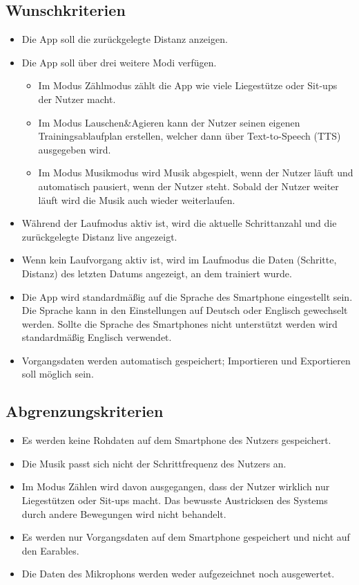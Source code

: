 \documentclass[a4paper,12pt]{article}
\begin{document}
\subsection{Wunschkriterien}
  \begin{itemize}
    \item Die App soll die zurückgelegte Distanz anzeigen.
    \item Die App soll über drei weitere Modi verfügen.
      \begin{itemize}
        \item Im Modus \glqq Zählmodus\grqq{} zählt die App wie viele Liegestütze oder Sit-ups der Nutzer macht.
        \item Im Modus \glqq Lauschen\&Agieren\grqq{} kann der Nutzer seinen eigenen Trainingsablaufplan erstellen, welcher dann über Text-to-Speech (\Gls{TTS}) ausgegeben wird.
        \item Im Modus \glqq Musikmodus\grqq{} wird Musik abgespielt, wenn der Nutzer läuft und automatisch pausiert, wenn der Nutzer steht. Sobald der Nutzer weiter läuft wird die Musik auch wieder weiterlaufen.
      \end{itemize}
    \item Während der \glqq Laufmodus\grqq{} aktiv ist, wird die aktuelle Schrittanzahl und die zurückgelegte Distanz live angezeigt.
    \item Wenn kein Laufvorgang aktiv ist, wird im Laufmodus die Daten (Schritte, Distanz) des letzten Datums angezeigt, an dem trainiert wurde. %
    \item Die App wird standardmäßig auf die Sprache des Smartphone eingestellt sein. Die Sprache kann in den Einstellungen auf Deutsch oder Englisch gewechselt werden. Sollte die Sprache des Smartphones nicht unterstützt werden wird standardmäßig Englisch verwendet. 
    \item Vorgangsdaten werden automatisch gespeichert; Importieren und Exportieren soll möglich sein.
  \end{itemize}
  \subsection{Abgrenzungskriterien}
  \begin{itemize}
    \item Es werden keine \Gls{Rohdaten} auf dem Smartphone des Nutzers gespeichert.
    \item Die Musik passt sich nicht der \Gls{Schrittfrequenz} des Nutzers an.
    \item Im Modus \glqq Zählen\grqq{} wird davon ausgegangen, dass der Nutzer wirklich nur Liegestützen oder Sit-ups macht. Das bewusste Austricksen des Systems durch andere Bewegungen wird nicht behandelt.
    \item Es werden nur Vorgangsdaten auf dem Smartphone gespeichert und nicht auf den \Gls{Earables}.
    \item Die Daten des Mikrophons werden weder aufgezeichnet noch ausgewertet.
  \end{itemize}
\end{document}
